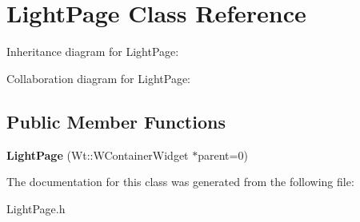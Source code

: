 \hypertarget{classLightPage}{}\section{Light\+Page Class Reference}
\label{classLightPage}


Inheritance diagram for Light\+Page\+:


Collaboration diagram for Light\+Page\+:
\subsection*{Public Member Functions}
\begin{DoxyCompactItemize}
\item 
\mbox{\label{classLightPage_a6d19a713f09e87654d930949ed3b13e8}} 
{\bfseries Light\+Page} (Wt\+::\+W\+Container\+Widget $\ast$parent=0)
\end{DoxyCompactItemize}


The documentation for this class was generated from the following file\+:\begin{DoxyCompactItemize}
\item 
Light\+Page.\+h\end{DoxyCompactItemize}
